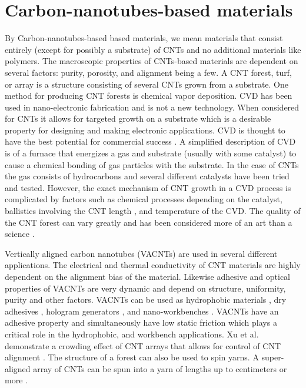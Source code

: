 \section{Carbon-nanotubes-based materials}

By Carbon-nanotubes-based based materials, we mean materials that consist entirely (except for possibly a substrate) of CNTs and no additional materials like polymers.	
The macroscopic properties of CNTs-based materials are dependent on several factors: purity, porosity, and alignment being a few.
A CNT forest, turf, or array is a structure consisting of several CNTs grown from a substrate.
One method for producing CNT forests is chemical vapor deposition.
CVD has been used in nano-electronic fabrication and is not a new technology.
When considered for CNTs it allows for targeted growth on a substrate which is a desirable property for designing and making electronic applications.
CVD is thought to have the best potential for commercial success \cite{Nessim2010}.
A simplified description of CVD is of a furnace that energizes a gas and substrate (usually with some catalyst) to cause a chemical bonding of gas particles with the substrate.
In the case of CNTs the gas consists of hydrocarbons and several different catalysts have been tried and tested.
However, the exact mechanism of CNT growth in a CVD process is complicated by factors such as chemical processes depending on the catalyst, ballistics involving the CNT length \cite{Louchev2003}, and temperature of the CVD.
The quality of the CNT forest can vary greatly and has been considered more of an art than a science \cite{Nessim2010}.  
	
Vertically aligned carbon nanotubes (VACNTs) are used in several different applications.
The electrical and thermal conductivity of CNT materials are highly dependent on the alignment bias of the material.
Likewise adhesive and optical properties of VACNTs are very dynamic and depend on structure, uniformity, purity and other factors.
VACNTs can be used as hydrophobic materials \cite{Lau2003}, dry adhesives \cite{Chen2012}, hologram generators \cite{Montelongo2013}, and nano-workbenches \cite{Gjerde2006}.
VACNTs have an adhesive property and simultaneously have low static friction which plays a critical role in the hydrophobic, and workbench applications.
Xu et al. demonstrate a crowding effect of CNT arrays that allows for control of CNT alignment \cite{Xu2012}.
The structure of a forest can also be used to spin yarns.
A super-aligned array of CNTs can be spun into a yarn of lengths up to centimeters or more \cite{Jiang2002}.
	
